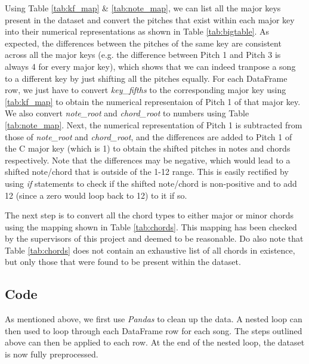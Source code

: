 Using Table \ref{tab:kf_map} \& \ref{tab:note_map}, we can list all the major keys present in the dataset and convert the pitches that exist within each major key into their numerical representations as shown in Table \ref{tab:bigtable}. As expected, the differences between the pitches of the same key are consistent across all the major keys (e.g. the difference between Pitch 1 and Pitch 3 is always 4 for every major key), which shows that we can indeed tranpose a song to a different key by just shifting all the pitches equally. For each DataFrame row, we just have to convert \emph{key\_fifths} to the corresponding major key using \ref{tab:kf_map} to obtain the numerical representaion of Pitch 1 of that major key. We also convert \emph{note\_root} and \emph{chord\_root} to numbers using Table \ref{tab:note_map}. Next, the numerical representation of Pitch 1 is subtracted from those of \emph{note\_root} and \emph{chord\_root}, and the differences are added to Pitch 1 of the C major key (which is 1) to obtain the shifted pitches in notes and chords respectively. Note that the differences may be negative, which would lead to a shifted note/chord that is outside of the 1-12 range. This is easily rectified by using \emph{if} statements to check if the shifted note/chord is non-positive and to add 12 (since a zero would loop back to 12) to it if so.

The next step is to convert all the chord types to either major or minor chords using the mapping shown in Table \ref{tab:chords}. This mapping has been checked by the supervisors of this project and deemed to be reasonable. Do also note that Table \ref{tab:chords} does not contain an exhaustive list of all chords in existence, but only those that were found to be present within the dataset.

\subsection{Code}
As mentioned above, we first use \emph{Pandas} to clean up the data. A nested loop can then used to loop through each DataFrame row for each song. The steps outlined above can then be applied to each row. At the end of the nested loop, the dataset is now fully preprocessed.


